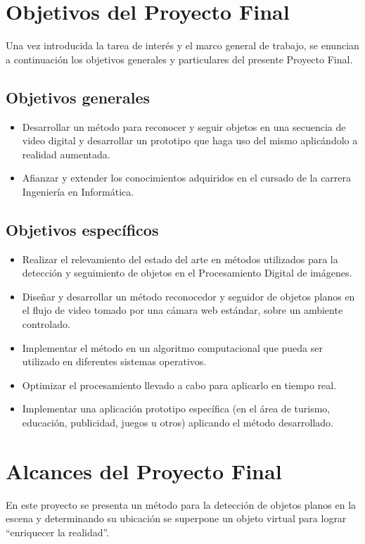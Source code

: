 \section{Objetivos del Proyecto Final}
Una vez introducida la tarea de interés y el marco general de trabajo, se enuncian a continuación los objetivos generales y particulares del presente Proyecto Final.
\subsection{Objetivos generales}
  \begin{itemize}
      \item Desarrollar un método para reconocer y seguir objetos en una secuencia de video digital y desarrollar un prototipo que haga uso del mismo aplicándolo a realidad aumentada.
      \item Afianzar y extender los conocimientos adquiridos en el cursado de la carrera Ingeniería en Informática.
  \end{itemize}
\subsection{Objetivos específicos}%
\begin{itemize}
	\item Realizar el relevamiento del estado del arte en métodos utilizados para la detección y seguimiento de objetos en el Procesamiento Digital de imágenes.
	\item Diseñar y desarrollar un método reconocedor y seguidor de objetos planos en el flujo de video tomado por una cámara web estándar, sobre un ambiente controlado.
	\item Implementar el método en un algoritmo computacional que pueda ser utilizado en diferentes sistemas operativos.
	\item Optimizar el procesamiento llevado a cabo para aplicarlo en tiempo real. 
	\item Implementar una aplicación prototipo específica (en el área de turismo, educación, publicidad, juegos u otros) aplicando el método desarrollado.
\end{itemize}
\section{Alcances del Proyecto Final}
En este proyecto se presenta un método para la detección de objetos planos en la escena y determinando su ubicación se superpone un objeto virtual para lograr ``enriquecer la realidad''.

